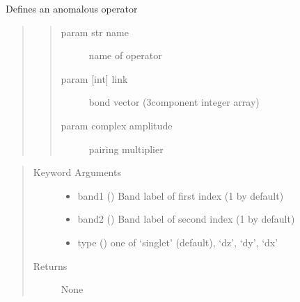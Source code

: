 \documentclass[letterpaper,10pt,english]{sphinxmanual}
\begin{document}

\begin{fulllineitems}
\label{\detokenize{functions:pyqcm.anomalous_operator}}
\sphinxAtStartPar
Defines an anomalous operator
\begin{quote}
\begin{quote}\begin{description}
\item[{param str name}] \leavevmode
\sphinxAtStartPar
name of operator

\item[{param {[}int{]} link}] \leavevmode
\sphinxAtStartPar
bond vector (3\sphinxhyphen{}component integer array)

\item[{param complex amplitude}] \leavevmode
\sphinxAtStartPar
pairing multiplier

\end{description}\end{quote}
\end{quote}
\begin{quote}\begin{description}
\item[{Keyword Arguments}] \leavevmode\begin{itemize}
\item {} 
\sphinxAtStartPar
band1 () \textendash{} Band label of first index (1 by default)

\item {} 
\sphinxAtStartPar
band2 () \textendash{} Band label of second index (1 by default)

\item {} 
\sphinxAtStartPar
type () \textendash{} one of ‘singlet’ (default), ‘dz’, ‘dy’, ‘dx’

\end{itemize}

\item[{Returns}] \leavevmode
\sphinxAtStartPar
None

\end{description}\end{quote}

\end{fulllineitems}
\end{document}
